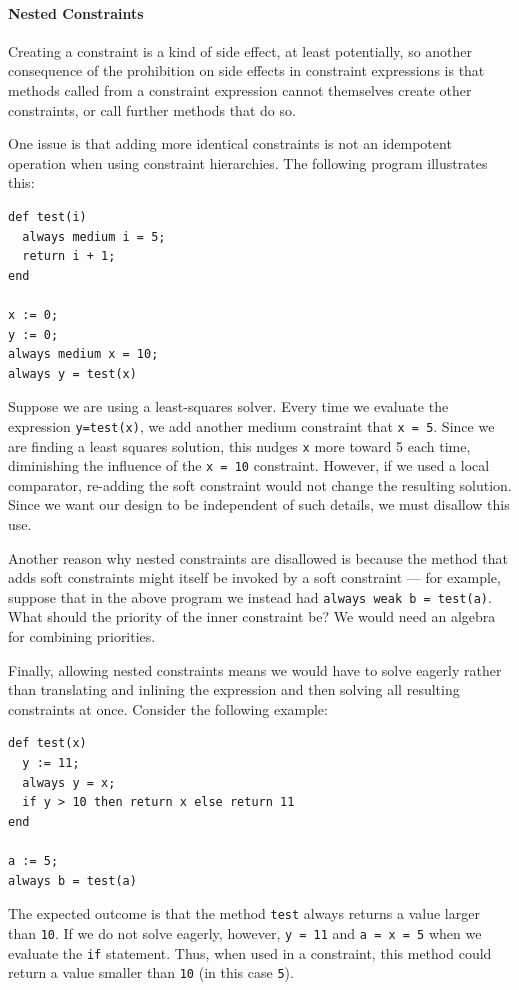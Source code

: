 \paragraph*{Nested Constraints}
Creating a constraint is a kind of side effect, at least potentially,
so another consequence of the prohibition on side effects in
constraint expressions is that methods called from a constraint
expression cannot themselves create other constraints, or call further
methods that do so. 

One issue is that adding more identical constraints is not an
idempotent operation when using constraint hierarchies. The following
program illustrates this:
\begin{lstlisting}
def test(i)
  always medium i = 5;
  return i + 1;
end

x := 0;
y := 0;
always medium x = 10;
always y = test(x)
\end{lstlisting}

Suppose we are using a least-squares solver.  Every time we evaluate
the expression \verb|y=test(x)|, we add another medium constraint
that \verb|x = 5|.  Since we are finding a least squares solution,
this nudges \verb|x| more toward 5 each time, diminishing the
influence of the \verb|x = 10| constraint. However, if we used a local
comparator, re-adding the soft constraint would not change the
resulting solution. Since we want our design to be independent of such
details, we must disallow this use.

Another reason why nested constraints are disallowed is because the
method that adds soft constraints might itself be invoked by a soft
constraint --- for example, suppose that in the above program we
instead had \verb|always weak b = test(a)|. What should the priority
of the inner constraint be? We would need an algebra for combining
priorities.

Finally, allowing nested constraints means we would have to solve
eagerly rather than translating and inlining the expression and then
solving all resulting constraints at once. Consider the following
example:
\begin{lstlisting}
def test(x)
  y := 11;
  always y = x;
  if y > 10 then return x else return 11
end

a := 5;
always b = test(a)
\end{lstlisting}
The expected outcome is that the method \verb!test! always returns a value
larger than \verb|10|. If we do not solve eagerly, however, \verb|y = 11| and
\verb|a = x = 5| when we evaluate the \verb|if| statement. Thus, when used in a
constraint, this method could return a value smaller than \verb!10! (in this
case \verb|5|).

